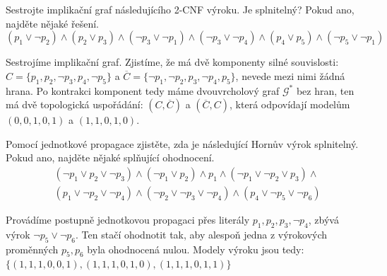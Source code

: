 \begin{problem} \label{problem:2sat}
    
    Sestrojte implikační graf následujícího 2-CNF výroku. Je splnitelný? Pokud ano, najděte nějaké řešení.
    $$
    (p_1\vee \neg p_2)\wedge (p_2\vee p_3)\wedge (\neg p_3\vee \neg p_1)\wedge (\neg p_3\vee \neg p_4)\wedge (p_4\vee p_5)\wedge (\neg p_5\vee \neg p_1)
    $$

    \begin{solution}
        Sestrojíme implikační graf. Zjistíme, že má dvě komponenty silné souvislosti: $C=\{p_1,p_2,\neg p_3,p_4,\neg p_5\}$ a $\overline{C}=\{\neg p_1,\neg p_2,p_3,\neg p_4,p_5\}$, nevede mezi nimi žádná hrana. Po kontrakci komponent tedy máme dvouvrcholový graf $\mathcal G^*$ bez hran, ten má dvě topologická uspořádání: $(C,\overline{C})$ a $(\overline{C},C)$, která odpovídají modelům $(0,0,1,0,1)$ a $(1,1,0,1,0)$.                
    \end{solution}

\end{problem}


\begin{problem}

    Pomocí jednotkové propagace zjistěte, zda je následující Hornův výrok splnitelný. Pokud ano, najděte nějaké splňující ohodnocení.
    \begin{align*}
        &(\neg p_1 \vee p_2 \vee \neg p_3)\wedge(\neg p_1 \vee p_2)\wedge p_1 \wedge (\neg p_1 \vee \neg p_2 \vee p_3)\wedge \\
        &(p_1\vee\neg p_2 \vee \neg p_4)\wedge(\neg p_2 \vee \neg p_3 \vee \neg p_4)\wedge(p_4\vee \neg p_5 \vee\neg p_6)
    \end{align*}

    \begin{solution}
        Provádíme postupně jednotkovou propagaci přes literály $p_1,p_2,p_3,\neg p_4$, zbývá výrok $\neg p_5\lor\neg p_6$. Ten stačí ohodnotit tak, aby alespoň jedna z výrokových proměnných $p_5,p_6$ byla ohodnocená nulou. Modely výroku jsou tedy: $\{(1,1,1,0,0,1),(1,1,1,0,1,0),(1,1,1,0,1,1)\}$                
    \end{solution}
    
\end{problem}


